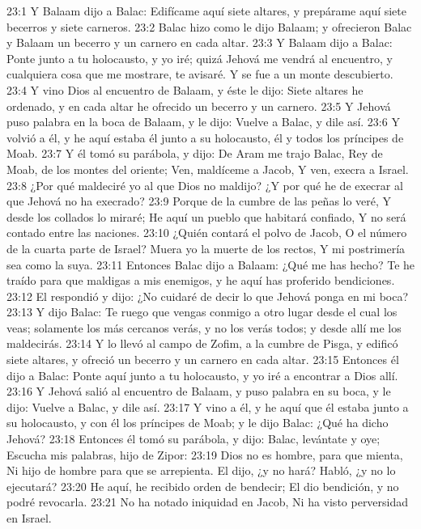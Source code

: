 23:1 Y Balaam dijo a Balac: Edifícame aquí siete altares, y prepárame aquí siete becerros y siete carneros.  
23:2 Balac hizo como le dijo Balaam; y ofrecieron Balac y Balaam un becerro y un carnero en cada altar.  
23:3 Y Balaam dijo a Balac: Ponte junto a tu holocausto, y yo iré; quizá Jehová me vendrá al encuentro, y cualquiera cosa que me mostrare, te avisaré. Y se fue a un monte descubierto.  
23:4 Y vino Dios al encuentro de Balaam, y éste le dijo: Siete altares he ordenado, y en cada altar he ofrecido un becerro y un carnero.  
23:5 Y Jehová puso palabra en la boca de Balaam, y le dijo: Vuelve a Balac, y dile así.  
23:6 Y volvió a él, y he aquí estaba él junto a su holocausto, él y todos los príncipes de Moab.  
23:7 Y él tomó su parábola, y dijo:  
De Aram me trajo Balac,  
Rey de Moab, de los montes del oriente;  
Ven, maldíceme a Jacob,  
Y ven, execra a Israel.  
23:8 ¿Por qué maldeciré yo al que Dios no maldijo?  
¿Y por qué he de execrar al que Jehová no ha execrado?  
23:9 Porque de la cumbre de las peñas lo veré,  
Y desde los collados lo miraré;  
He aquí un pueblo que habitará confiado,  
Y no será contado entre las naciones.  
23:10 ¿Quién contará el polvo de Jacob,  
O el número de la cuarta parte de Israel?  
Muera yo la muerte de los rectos,  
Y mi postrimería sea como la suya.  
23:11 Entonces Balac dijo a Balaam: ¿Qué me has hecho? Te he traído para que maldigas a mis enemigos, y he aquí has proferido bendiciones.  
23:12 El respondió y dijo: ¿No cuidaré de decir lo que Jehová ponga en mi boca?  
23:13 Y dijo Balac: Te ruego que vengas conmigo a otro lugar desde el cual los veas; solamente los más cercanos verás, y no los verás todos; y desde allí me los maldecirás.  
23:14 Y lo llevó al campo de Zofim, a la cumbre de Pisga, y edificó siete altares, y ofreció un becerro y un carnero en cada altar.  
23:15 Entonces él dijo a Balac: Ponte aquí junto a tu holocausto, y yo iré a encontrar a Dios allí.  
23:16 Y Jehová salió al encuentro de Balaam, y puso palabra en su boca, y le dijo: Vuelve a Balac, y dile así.  
23:17 Y vino a él, y he aquí que él estaba junto a su holocausto, y con él los príncipes de Moab; y le dijo Balac: ¿Qué ha dicho Jehová?  
23:18 Entonces él tomó su parábola, y dijo:  
Balac, levántate y oye;  
Escucha mis palabras, hijo de Zipor:  
23:19 Dios no es hombre, para que mienta,  
Ni hijo de hombre para que se arrepienta.  
El dijo, ¿y no hará?  
Habló, ¿y no lo ejecutará?  
23:20 He aquí, he recibido orden de bendecir;  
El dio bendición, y no podré revocarla.  
23:21 No ha notado iniquidad en Jacob,  
Ni ha visto perversidad en Israel.  
